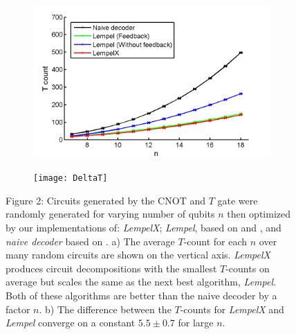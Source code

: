 \documentclass[a0,landscape]{a0poster}
\begin{document}
\begin{multicols}{3}
\begin{minipage}[b]{0.95\linewidth}
\begin{tcolorbox}[title=\textcolor{white}{\huge\textbf{\textsf{Results}\textcolor{black}{y}}},left=0.5cm,right=0.5cm,top=0.5cm,bottom=0.5cm]
		
		\centering
		\begin{tcolorbox}[reset, colback=gray!75,colframe=black]
			\begin{figure}
				\centering
				\begin{subfigure}{0.45\textwidth}
					\centering
					\includegraphics[width=\linewidth,frame]{LX_vs_Lempel}
					\subcaption{}
				\end{subfigure}\hspace{1cm}									
				\begin{subfigure}{0.47\textwidth}
					\centering
					\texttt{[image: DeltaT]}
					\subcaption{}
				\end{subfigure}
				\caption*{\footnotesize Figure 2: Circuits generated by the $\mathrm{CNOT}$ and $T$ gate were randomly generated for varying number of qubits $n$ then optimized by our implementations of: \emph{LempelX}; \emph{Lempel}, based on \cite{1_Campbell_2017} and \cite{20_Lempel_1975}, and \emph{naive decoder} based on \cite{8_Amy_2016}. a) The average $T$-count for each $n$ over many random circuits are shown on the vertical axis. \emph{LempelX} produces circuit decompositions with the smallest $T$-counts on average but scales the same as the next best algorithm, \emph{Lempel}. Both of these algorithms are better than the naive decoder by a factor $n$. b) The difference between the $T$-counts for \emph{LempelX} and \emph{Lempel} converge on a constant $5.5\pm 0.7$ for large $n$.}
			\end{figure}
		\end{tcolorbox}
	

\end{tcolorbox}
\end{minipage}
\end{multicols}
\end{document}
